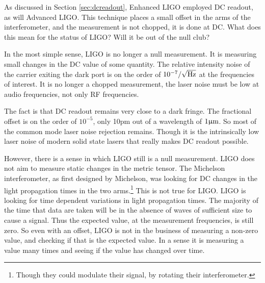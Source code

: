 As discussed in Section \ref{sec:dcreadout}, Enhanced LIGO employed DC readout, as will Advanced LIGO. %
This technique places a small offset in the arms of the interferometer, and the measurement is not chopped, it is done at DC. %
What does this mean for the status of LIGO? %
Will it be out of the null club?

In the most simple sense, LIGO is no longer a null measurement. %
It is measuring small changes in the DC value of some quantity. %
The relative intensity noise of the carrier exiting the dark port is on the order of $10^{-7}/\sqrt{\rm{Hz}}$ at the frequencies of interest. %
It is no longer a chopped measurement, the laser noise must be low at audio frequencies, not only RF frequencies.

The fact is that DC readout remains very close to a dark fringe. %
The fractional offset is on the order of $10^{-5}$, only 10pm out of a wavelength of $1\upmu \rm m$. %
So most of the common mode laser noise rejection remains. %
Though it is the intrinsically low laser noise of modern solid state lasers that really makes DC readout possible.

However, there is a sense in which LIGO still is a null measurement. %
LIGO does not aim to measure static changes in the metric tensor. %
The Michelson interferometer, as first designed by Michelson, was looking for DC changes in the light propagation times in the two arms.\footnote{Though they could modulate their signal, by rotating their interferometer.} This is not true for LIGO. %
LIGO is looking for time dependent variations in light propagation times. %
The majority of the time that data are taken will be in the absence of waves of sufficient size to cause a signal. %
Thus the expected value, at the measurement frequencies, is still zero. %
So even with an offset, LIGO is not in the business of measuring a non-zero value, and checking if that is the expected value. %
In a sense it is measuring a value many times and seeing if the value has changed over time.
